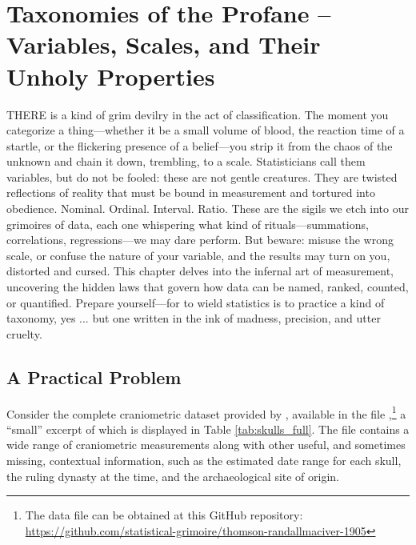 \chapter{Taxonomies of the Profane – Variables, Scales, and Their Unholy Properties}

\IMFellEnglish
\lettrine[lines=5, realheight]{T}{HERE} is a kind of grim devilry in the act of classification. The moment you categorize a thing—whether it be a small volume of blood, the reaction time of a startle, or the flickering presence of a belief—you strip it from the chaos of the unknown and chain it down, trembling, to a scale. Statisticians call them variables, but do not be fooled: these are not gentle creatures. They are twisted reflections of reality that must be bound in measurement and tortured into obedience. Nominal. Ordinal. Interval. Ratio. These are the sigils we etch into our grimoires of data, each one whispering what kind of rituals—summations, correlations, regressions—we may dare perform. But beware: misuse the wrong scale, or confuse the nature of your variable, and the results may turn on you, distorted and cursed. This chapter delves into the infernal art of measurement, uncovering the hidden laws that govern how data can be named, ranked, counted, or quantified. Prepare yourself—for to wield statistics is to practice a kind of taxonomy, yes  ... but one written in the ink of madness, precision, and utter cruelty.

\normalfont

\section{A Practical Problem}

Consider the complete craniometric dataset provided by  \textcite{Thomson1905}, available in the file ,\footnote{The data file can be obtained at this GitHub repository: \url{https://github.com/statistical-grimoire/thomson-randallmaciver-1905}} a ``small'' excerpt of which is displayed in Table \ref{tab:skulls_full}. The file contains a wide range of craniometric measurements along with other useful, and sometimes missing, contextual information, such as the estimated date range for each skull, the ruling dynasty at the time, and the archaeological site of origin. 

